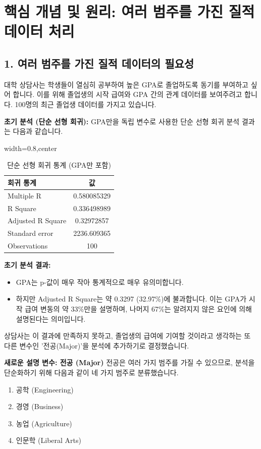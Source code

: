 \documentclass[11pt,a4paper]{book}
\theoremstyle{definition}
\begin{document}
\section{핵심 개념 및 원리: 여러 범주를 가진 질적 데이터 처리}

\subsection{1. 여러 범주를 가진 질적 데이터의 필요성}
대학 상담사는 학생들이 열심히 공부하여 높은 GPA로 졸업하도록 동기를 부여하고 싶어 합니다. 이를 위해 졸업생의 시작 급여와 GPA 간의 관계 데이터를 보여주려고 합니다. 100명의 최근 졸업생 데이터를 가지고 있습니다.

\textbf{초기 분석 (단순 선형 회귀):}
GPA만을 독립 변수로 사용한 단순 선형 회귀 분석 결과는 다음과 같습니다.

\begin{table}[htbp]
\centering
\caption{단순 선형 회귀 통계 (GPA만 포함)}
\label{tab:simple_reg_gpa}
\begin{adjustbox}{width=0.8\textwidth,center}
\begin{tabular}{lc}
\toprule
\textbf{회귀 통계} & \textbf{값} \\
\midrule
Multiple R & 0.580085329 \\
R Square & 0.336498989 \\
Adjusted R Square & 0.32972857 \\
Standard error & 2236.609365 \\
Observations & 100 \\
\bottomrule
\end{tabular}
\end{adjustbox}
\end{table}

\begin{summarybox}
\textbf{초기 분석 결과:}
\begin{itemize}
    \item GPA는 p-값이 매우 작아 통계적으로 매우 유의미합니다.
    \item 하지만 Adjusted R Square는 약 0.3297 (32.97\%)에 불과합니다. 이는 GPA가 시작 급여 변동의 약 33\%만을 설명하며, 나머지 67\%는 알려지지 않은 요인에 의해 설명된다는 의미입니다.
\end{itemize}
상담사는 이 결과에 만족하지 못하고, 졸업생의 급여에 기여할 것이라고 생각하는 또 다른 변수인 '전공(Major)'을 분석에 추가하기로 결정했습니다.
\end{summarybox}

\textbf{새로운 설명 변수: 전공 (Major)}
전공은 여러 가지 범주를 가질 수 있으므로, 분석을 단순화하기 위해 다음과 같이 네 가지 범주로 분류했습니다.
\begin{enumerate}
    \item 공학 (Engineering)
    \item 경영 (Business)
    \item 농업 (Agriculture)
    \item 인문학 (Liberal Arts)
\end{enumerate}
\end{document}
